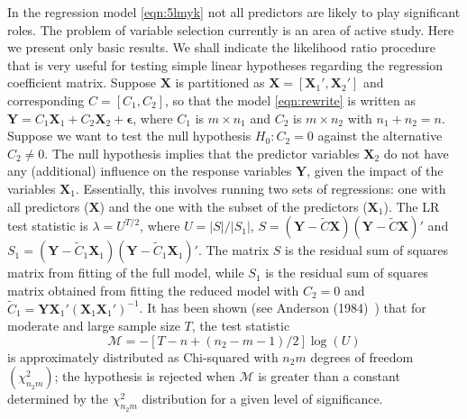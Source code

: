 \begin{result}
In the regression model \eqref{eqn:5lmyk} not all predictors are likely to play significant roles. The problem of variable selection currently is an area of active study. Here we present only basic results. We shall indicate the likelihood ratio procedure that is very useful for testing simple linear hypotheses regarding the regression coefficient matrix. Suppose $\mathbf{X}$ is partitioned as $\mathbf{X}= [\mathbf{X}_1', \mathbf{X}_2']$ and corresponding $C= [C_1, C_2]$, so that the model \eqref{eqn:rewrite} is written as $\mathbf{Y}= C_1 \mathbf{X}_1 + C_2 \mathbf{X}_2 + \mathbf{\epsilon}$, where $C_1$ is $m \times n_1$ and $C_2$ is $m \times n_2$ with $n_1 + n_2= n$. Suppose we want to test the null hypothesis $H_0: C_2= 0$ against the alternative $C_2 \neq 0$. The null hypothesis implies that the predictor variables $\mathbf{X}_2$ do not have any (additional) influence on the response variables $\mathbf{Y}$, given the impact of the variables $\mathbf{X}_1$. Essentially, this involves running two sets of regressions: one with all predictors ($\mathbf{X}$) and the one with the subset of the predictors ($\mathbf{X}_1$). The LR test statistic is $\lambda= U^{T/2}$, where $U= \lvert S\rvert / \lvert S_1 \rvert$, $S= (\mathbf{Y} - \tilde{C} \mathbf{X} )(\mathbf{Y} - \tilde{C} \mathbf{X} )'$ and $S_1= (\mathbf{Y}-\tilde{C}_1 \mathbf{X}_1 )( \mathbf{Y} - \tilde{C}_1 \mathbf{X}_1 )'$. The matrix $S$ is the residual sum of squares matrix from fitting of the full model, while $S_1$ is the residual sum of squares matrix obtained from fitting the reduced model with $C_2=0$ and $\tilde{C}_1= \mathbf{Y} \mathbf{X}_1' (\mathbf{X}_1 \mathbf{X}_1')^{-1}$. It has been shown (see Anderson (1984)~\cite[Chap. 8]{andersontw2}) that for moderate and large sample size $T$, the test statistic 
	\begin{equation} \label{eqn:mathcal}
	\mathcal{M}= -[T - n + (n_2 - m - 1)/2] \log(U)
	\end{equation}
is approximately distributed as Chi-squared with $n_2 m$ degrees of freedom $(\chi_{n_2m}^2)$; the hypothesis is rejected when $\mathcal{M}$ is greater than a constant determined by the $\chi_{n_2m}^2$ distribution for a given level of significance.
\end{result}


